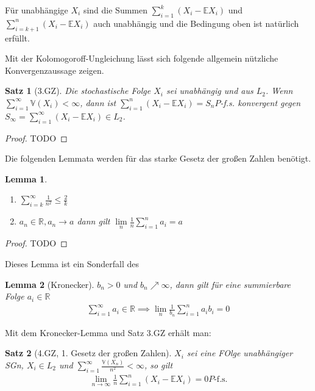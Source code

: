 \documentclass[]{article}
\newtheorem{theorem}{Satz}
\newtheorem{lemma}{Lemma}
\begin{document}
Für unabhängige $X_i$ sind die Summen $\sum_{i=1}^{k}(X_i - \mathbb{E}X_i)$ und $\sum_{i=k+1}^{n}(X_i - \mathbb{E}X_i)$ auch unabhängig und die Bedingung oben ist natürlich erfüllt.

Mit der Kolomogoroff-Ungleichung lässt sich folgende allgemein nützliche Konvergenzaussage zeigen.

\begin{theorem}[3.GZ]
	Die stochastische Folge $X_i$ sei unabhängig und aus $L_2$. Wenn $\sum_{i=1}^{\infty}\mathbb{V}(X_i) < \infty$, dann ist $\sum_{i=1}^{n}(X_i - \mathbb{E}X_i) = S_n P$-f.s. konvergent gegen $S_\infty = \sum_{i=1}^{\infty}(X_i - \mathbb{E}X_i) \in L_2$.
\end{theorem}

\begin{proof}
	TODO
\end{proof}

Die folgenden Lemmata werden für das starke Gesetz der großen Zahlen benötigt.
\begin{lemma}
	\begin{enumerate}
		\item $\sum_{i=k}^{\infty} \frac{1}{n^2} \leq \frac{2}{k}$
		\item $a_n \in \mathbb{R}, a_n\rightarrow a$ dann gilt $\lim\limits_{n}\frac{1}{n}\sum_{i=1}^{n}a_i = a$
	\end{enumerate}
\end{lemma}

\begin{proof}
	TODO
\end{proof}

Dieses Lemma ist ein Sonderfall des
\begin{lemma}[Kronecker]
	$b_n > 0$ und $b_n\nearrow\infty$, dann gilt für eine summierbare Folge $a_i \in \mathbb{R}$
	\begin{align*}
		\sum_{i=1}^{\infty}a_i \in \mathbb{R} \implies \lim_n \frac{1}{b_n} \sum_{i=1}^{n} a_i b_i = 0
	\end{align*}
\end{lemma}

Mit dem Kronecker-Lemma und Satz 3.GZ erhält man:
\begin{theorem}[4.GZ, 1. Gesetz der großen Zahlen]
	$X_i$ sei eine FOlge unabhängiger SGn, $X_i\in L_2$ und $\sum_{i=1}^{\infty} \frac{\mathbb{V}(X_n)}{n^2} < \infty$, so gilt
	\begin{align*}
		\lim\limits_{n\rightarrow\infty} \frac{1}{n} \sum_{i=1}^{n}(X_i - \mathbb{E}X_i) = 0 P\text{-f.s.}
	\end{align*}
\end{theorem}
\end{document}
